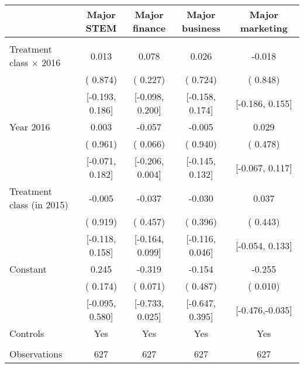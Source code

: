 \begin{tabular}{lcccc} \toprule
& Major STEM  & Major finance & Major business & Major marketing \tabularnewline \midrule
&  &  &  & \tabularnewline
Treatment class $\times$ 2016 &  0.013 &  0.078 &  0.026 & -0.018\tabularnewline
& ( 0.874) & ( 0.227) & ( 0.724) & ( 0.848)\tabularnewline
& {[}-0.193, 0.186{]} & {[}-0.098, 0.200{]} & {[}-0.158, 0.174{]} & {[}-0.186, 0.155{]}\tabularnewline
Year 2016  &  0.003 & -0.057 & -0.005 &  0.029\tabularnewline
& ( 0.961) & ( 0.066) & ( 0.940) & ( 0.478)\tabularnewline
& {[}-0.071, 0.182{]} & {[}-0.206, 0.004{]} & {[}-0.145, 0.132{]} & {[}-0.067, 0.117{]}\tabularnewline
Treatment class (in 2015) & -0.005 & -0.037 & -0.030 &  0.037\tabularnewline
& ( 0.919) & ( 0.457) & ( 0.396) & ( 0.443)\tabularnewline
& {[}-0.118, 0.158{]} & {[}-0.164, 0.099{]} & {[}-0.116, 0.046{]} & {[}-0.054, 0.133{]}\tabularnewline
Constant  &  0.245 & -0.319 & -0.154 & -0.255\tabularnewline
& ( 0.174) & ( 0.071) & ( 0.487) & ( 0.010)\tabularnewline
& {[}-0.095, 0.580{]} & {[}-0.733, 0.025{]} & {[}-0.647, 0.395{]} & {[}-0.476,-0.035{]}\tabularnewline
Controls & Yes & Yes & Yes & Yes\tabularnewline
&  &  &  & \tabularnewline
Observations & 627 & 627 & 627 & 627\tabularnewline
\bottomrule \bottomrule
\end{tabular}
